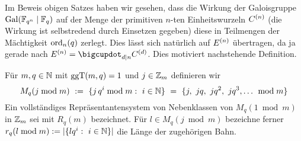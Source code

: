 Im Beweis obigen Satzes haben wir gesehen, dass die Wirkung der Galoisgruppe
$\operatorname{Gal}(\mathbb{F}_{q^n}\mid \mathbb{F}_q)$ auf der Menge der primitiven $n$-ten Einheitswurzeln
$C^{(n)}$ (die Wirkung ist selbstredend durch Einsetzen gegeben) diese in 
Teilmengen der Mächtigkeit $\operatorname{ord}_n(q)$ zerlegt.
Dies lässt sich natürlich auf $E^{(n)}$ übertragen, da ja gerade 
nach 
$E\kl n = \bigcupdot_{d\mid n} C\kl d$. 
Dies motiviert nachstehende Definition.


  


\begin{definition}
  \label{def:nebenklassen_mod_m}
  Für $m,q\in\mathbb{N}$ mit $\operatorname{ggT}(m,q) = 1$ und $j \in \mathbb{Z}_m$ definieren wir
  \[ M_q(j\bmod m) \speq{:=} \{ j\,q^i \bmod m:\ i\in\N\} \speq= 
    \{j,\ jq,\ jq^2,\ jq^3,\ldots\ \bmod m\}\]
  Ein vollständiges Repräsentantensystem von Nebenklassen von $M_q(1\bmod m)$
  in $\mathbb{Z}_m$ sei mit $R_q(m)$ bezeichnet. Für $l \in M_q(j\bmod m)$ 
  bezeichne ferner
  $r_q(l \bmod m) := |\{lq^i:\ i\in \N \}|$ die Länge der zugehörigen Bahn.
\end{definition}

